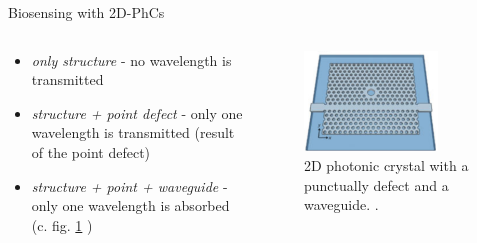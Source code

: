 \begin{frame}{Biosensing with 2D-PhCs}

  \begin{columns}

    \begin{column}{0.49\textwidth}
    \begin{itemize}
      \setlength\itemsep{1.2em}
      \item{\emph{only structure} - no wavelength is transmitted }
      \item{\emph{structure + point defect} - only one wavelength is transmitted (result of the point defect)}
      \item{\emph{structure + point + waveguide} - only one wavelength is absorbed (c. fig. \ref{fig: 2d_photonic_crystal} )}
    \end{itemize}
    \end{column}

    \begin{column}{0.49\textwidth}
    \begin{figure}
      \centering
      \includegraphics[width=0.8\textwidth]{./bilder/2dphc_waveguide_point_defect.png}
      \caption{2D photonic crystal with a punctually defect and a waveguide. \cite{nano}.}
      \label{fig: 2d_photonic_crystal}
    \end{figure}
  \end{column}

  \end{columns}

\end{frame}

